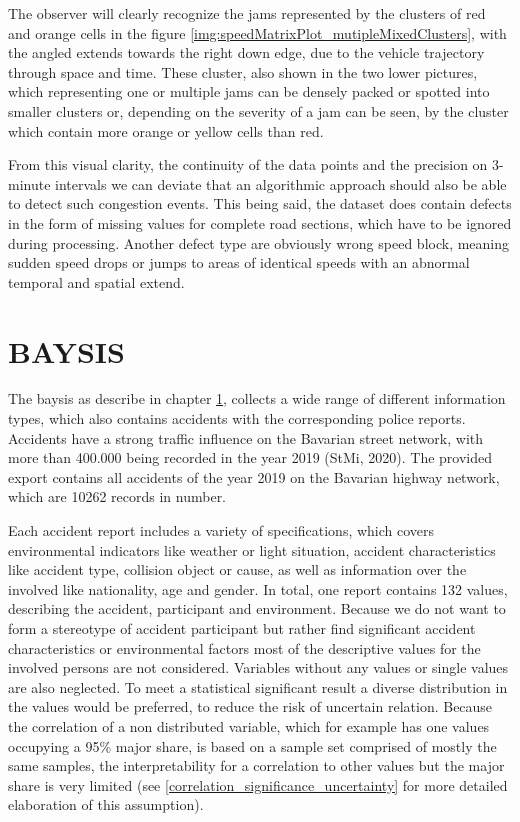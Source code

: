 \documentclass[a4paper,12pt]{report}
\begin{document}
The observer will clearly recognize the jams represented by the clusters of red and orange cells in the figure \ref{img:speedMatrixPlot_mutipleMixedClusters}, with the angled extends towards the right down edge, due to the vehicle trajectory through space and time. These cluster, also shown in the two lower pictures, which representing one or multiple jams can be densely packed or spotted into smaller clusters or, depending on the severity of a jam can be seen, by the cluster which contain more orange or yellow cells than red. 

From this visual clarity, the continuity of the data points and the precision on 3-minute intervals we can deviate that an algorithmic approach should also be able to detect such congestion events. This being said, the dataset does contain defects in the form of missing values for complete road sections, which have to be ignored during processing. Another defect type are obviously wrong speed block, meaning sudden speed drops or jumps to areas of identical speeds with an abnormal temporal and spatial extend. 

\section{BAYSIS}
\label{dataset_baysis}

The \acrfull{baysis} as describe in chapter \ref{dataset_baysis}, collects a wide range of different information types, which also contains accidents with the corresponding police reports. Accidents have a strong traffic influence on the Bavarian street network, with more than 400.000 being recorded in the year 2019 (StMi, 2020). The provided export contains all accidents of the year 2019 on the Bavarian highway network, which are 10262 records in number. 

Each accident report includes a variety of specifications, which covers environmental indicators like weather or light situation, accident characteristics like accident type, collision object or cause, as well as information over the involved like nationality, age and gender. In total, one report contains 132 values, describing the accident, participant and environment. Because we do not want to form a stereotype of accident participant but rather find significant accident characteristics or environmental factors most of the descriptive values for the involved persons are not considered. Variables without any values or single values are also neglected. To meet a statistical significant result a diverse distribution in the values would be preferred, to reduce the risk of uncertain relation. Because the correlation of a non distributed variable, which for example has one values occupying a 95\% major share, is based on a sample set comprised of mostly the same samples, the interpretability for a correlation to other values but the major share is very limited (see \ref{correlation_significance_uncertainty} for more detailed elaboration of this assumption).
\end{document}
